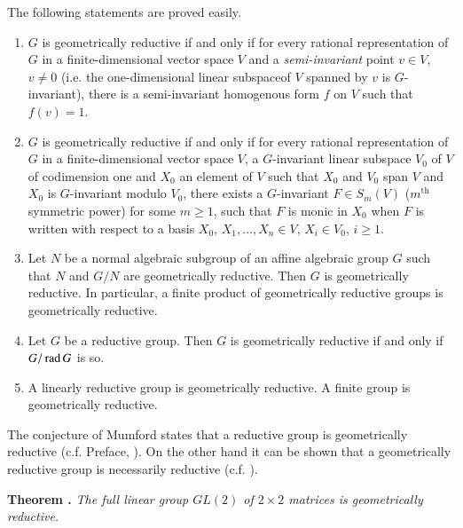 The following statements are proved easily.
\begin{enumerate}
\renewcommand{\labelenumi}{(\theenumi)}
\item $G$ is geometrically reductive if and only if for every rational representation of $G$ in a finite-dimensional vector space $V$ and a {\em semi-invariant} point $v\in V$, $v\neq 0$ (i.e. the one-dimensional linear subspace\pageoriginale of $V$ spanned by $v$ is $G$-invariant), there is a semi-invariant homogenous form $f$ on $V$ such that $f(v)=1$.

\item $G$ is geometrically reductive if and only if for every rational representation of $G$ in a finite-dimensional vector space $V$, a $G$-invariant linear subspace $V_{0}$ of $V$ of codimension one and $X_{0}$ an element of $V$ such that $X_{0}$ and $V_{0}$ span $V$ and $X_{0}$ is $G$-invariant modulo $V_{0}$, there exists a $G$-invariant $F\in S_{m}(V)$ ($m^{\text{th}}$ symmetric power) for some $m\geq 1$, such that $F$ is monic in $X_{0}$ when $F$ is written with respect to a basis $X_{0}$, $X_{1},\ldots, X_{n}\in V$, $X_{i}\in V_{0}$, $i\geq 1$.

\item Let $N$ be a normal algebraic subgroup of an affine algebraic group $G$ such that $N$ and $G/N$ are geometrically reductive. Then $G$ is geometrically reductive. In particular, a finite product of geometrically reductive groups is geometrically reductive.

\item Let $G$ be a reductive group. Then $G$ is geometrically reductive if and only if $G/\operatorname{\mathrm{rad}} G$ is so.

\item A linearly reductive group is geometrically reductive. A finite group is geometrically reductive.
\end{enumerate}

The conjecture of Mumford states that a reductive group is geometrically reductive (c.f. Preface, \cite{art18-key3}). On the other hand it can be shown that a geometrically reductive group is necessarily reductive (c.f. \cite{art18-key8}).

\medskip
\noindent
{\bf Theorem .\label{art18-thm1}}
{\em The full linear group $GL(2)$ of $2\times 2$ matrices is geometrically reductive.}
\smallskip

